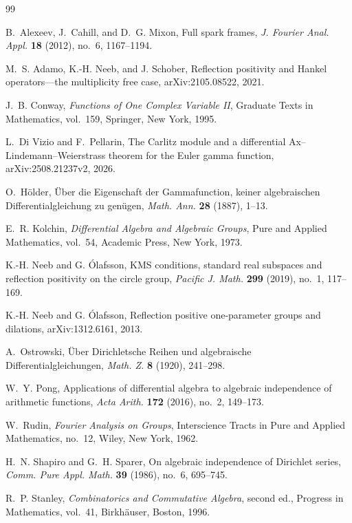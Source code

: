 \documentclass[11pt]{article}
\theoremstyle{definition}
\theoremstyle{remark}
\begin{document}
\begin{thebibliography}{99}

B.~Alexeev, J.~Cahill, and D.~G. Mixon,
Full spark frames,
\emph{J. Fourier Anal. Appl.} \textbf{18} (2012), no.~6, 1167--1194.

M.~S. Adamo, K.-H. Neeb, and J. Schober,
Reflection positivity and Hankel operators---the multiplicity free case,
arXiv:2105.08522, 2021.

J.~B. Conway,
\emph{Functions of One Complex Variable II},
Graduate Texts in Mathematics, vol.~159, Springer, New York, 1995.

L.~Di Vizio and F.~Pellarin,
The Carlitz module and a differential Ax--Lindemann--Weierstrass theorem for the Euler gamma
function,
arXiv:2508.21237v2, 2026.

O.~H\"older,
\"Uber die Eigenschaft der Gammafunction, keiner algebraischen Differentialgleichung zu
gen\"ugen,
\emph{Math. Ann.} \textbf{28} (1887), 1--13.

E.~R. Kolchin,
\emph{Differential Algebra and Algebraic Groups},
Pure and Applied Mathematics, vol.~54, Academic Press, New York, 1973.

K.-H. Neeb and G. \'Olafsson,
KMS conditions, standard real subspaces and reflection positivity on the circle group,
\emph{Pacific J. Math.} \textbf{299} (2019), no.~1, 117--169.

K.-H. Neeb and G. \'Olafsson,
Reflection positive one-parameter groups and dilations,
arXiv:1312.6161, 2013.

A.~Ostrowski,
\"Uber Dirichletsche Reihen und algebraische Differentialgleichungen,
\emph{Math. Z.} \textbf{8} (1920), 241--298.

W.~Y. Pong,
Applications of differential algebra to algebraic independence of arithmetic functions,
\emph{Acta Arith.} \textbf{172} (2016), no.~2, 149--173.

W.~Rudin,
\emph{Fourier Analysis on Groups},
Interscience Tracts in Pure and Applied Mathematics, no.~12, Wiley, New York, 1962.

H.~N. Shapiro and G.~H. Sparer,
On algebraic independence of Dirichlet series,
\emph{Comm. Pure Appl. Math.} \textbf{39} (1986), no.~6, 695--745.

R.~P. Stanley,
\emph{Combinatorics and Commutative Algebra}, second ed.,
Progress in Mathematics, vol.~41, Birkh\"auser, Boston, 1996.

\end{thebibliography}
\end{document}
